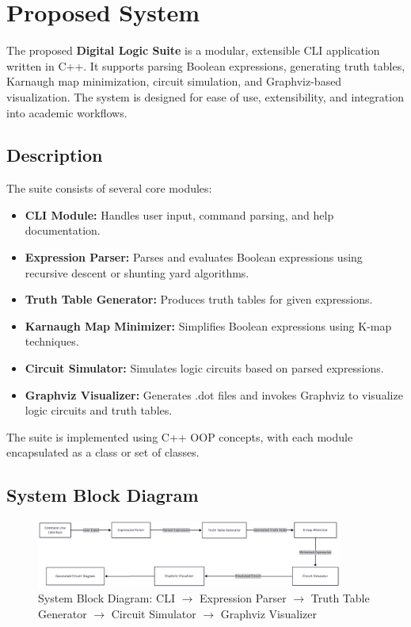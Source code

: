 \section{Proposed System}
The proposed \textbf{Digital Logic Suite} is a modular, extensible CLI application written in C++. It supports parsing Boolean expressions, generating truth tables, Karnaugh map minimization, circuit simulation, and Graphviz-based visualization. The system is designed for ease of use, extensibility, and integration into academic workflows.

\vspace{0.5em}

\subsection{Description}
The suite consists of several core modules:
\begin{itemize}
    \item \textbf{CLI Module:} Handles user input, command parsing, and help documentation.
    \item \textbf{Expression Parser:} Parses and evaluates Boolean expressions using recursive descent or shunting yard algorithms.
    \item \textbf{Truth Table Generator:} Produces truth tables for given expressions.
    \item \textbf{Karnaugh Map Minimizer:} Simplifies Boolean expressions using K-map techniques.
    \item \textbf{Circuit Simulator:} Simulates logic circuits based on parsed expressions.
    \item \textbf{Graphviz Visualizer:} Generates .dot files and invokes Graphviz to visualize logic circuits and truth tables.
\end{itemize}
The suite is implemented using C++ OOP concepts, with each module encapsulated as a class or set of classes.

\vspace{0.5em}

\subsection{System Block Diagram}
\begin{figure}[ht!]
    \centering

    \includegraphics[width=0.9\textwidth]{images/FINAL_V1.png}
    \caption{System Block Diagram: CLI $\rightarrow$ Expression Parser $\rightarrow$ Truth Table Generator $\rightarrow$ Circuit Simulator $\rightarrow$ Graphviz Visualizer}
    \label{fig:system_block_diagram}
\end{figure}